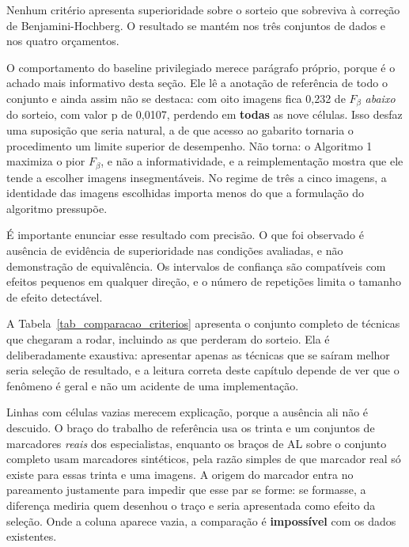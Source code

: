

Nenhum critério apresenta superioridade sobre o sorteio que sobreviva à correção de Benjamini-Hochberg. O resultado se mantém nos três conjuntos de dados e nos quatro orçamentos.

O comportamento do baseline privilegiado merece parágrafo próprio, porque é o achado mais informativo desta seção. Ele lê a anotação de referência de todo o conjunto e ainda assim não se destaca: com oito imagens fica 0,232 de $F_\beta$ \emph{abaixo} do sorteio, com valor p de 0,0107, perdendo em \textbf{todas} as nove células. Isso desfaz uma suposição que seria natural, a de que acesso ao gabarito tornaria o procedimento um limite superior de desempenho. Não torna: o Algoritmo 1 maximiza o pior $F_\beta$, e não a informatividade, e a reimplementação mostra que ele tende a escolher imagens insegmentáveis. No regime de três a cinco imagens, a identidade das imagens escolhidas importa menos do que a formulação do algoritmo pressupõe.

É importante enunciar esse resultado com precisão. O que foi observado é ausência de evidência de superioridade nas condições avaliadas, e não demonstração de equivalência. Os intervalos de confiança são compatíveis com efeitos pequenos em qualquer direção, e o número de repetições limita o tamanho de efeito detectável.

A Tabela~\ref{tab_comparacao_criterios} apresenta o conjunto completo de técnicas que chegaram a rodar, incluindo as que perderam do sorteio. Ela é deliberadamente exaustiva: apresentar apenas as técnicas que se saíram melhor seria seleção de resultado, e a leitura correta deste capítulo depende de ver que o fenômeno é geral e não um acidente de uma implementação.

\begin{table}[htb]
\centering
\caption{Todas as técnicas avaliadas, contra o sorteio.}
\label{tab_comparacao_criterios}

\end{table}



Linhas com células vazias merecem explicação, porque a ausência ali não é descuido. O braço do trabalho de referência usa os trinta e um conjuntos de marcadores \emph{reais} dos especialistas, enquanto os braços de \ac{AL} sobre o conjunto completo usam marcadores sintéticos, pela razão simples de que marcador real só existe para essas trinta e uma imagens. A origem do marcador entra no pareamento justamente para impedir que esse par se forme: se formasse, a diferença mediria quem desenhou o traço e seria apresentada como efeito da seleção. Onde a coluna aparece vazia, a comparação é \textbf{impossível} com os dados existentes.

